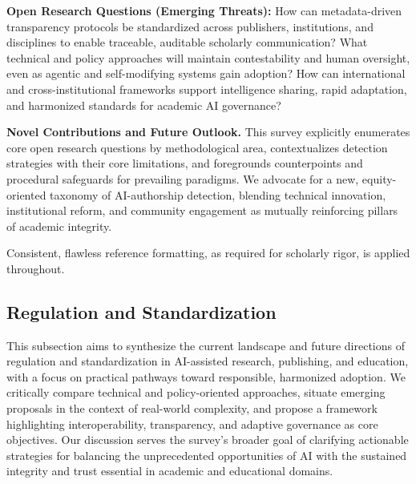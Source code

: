 \documentclass[sigconf]{acmart}
\begin{document}
\textbf{Open Research Questions (Emerging Threats):}
How can metadata-driven transparency protocols be standardized across publishers, institutions, and disciplines to enable traceable, auditable scholarly communication?
What technical and policy approaches will maintain contestability and human oversight, even as agentic and self-modifying systems gain adoption?
How can international and cross-institutional frameworks support intelligence sharing, rapid adaptation, and harmonized standards for academic AI governance?

\textbf{Novel Contributions and Future Outlook.}
This survey explicitly enumerates core open research questions by methodological area, contextualizes detection strategies with their core limitations, and foregrounds counterpoints and procedural safeguards for prevailing paradigms. We advocate for a new, equity-oriented taxonomy of AI-authorship detection, blending technical innovation, institutional reform, and community engagement as mutually reinforcing pillars of academic integrity.

Consistent, flawless reference formatting, as required for scholarly rigor, is applied throughout.

\subsection{Regulation and Standardization}

This subsection aims to synthesize the current landscape and future directions of regulation and standardization in AI-assisted research, publishing, and education, with a focus on practical pathways toward responsible, harmonized adoption. We critically compare technical and policy-oriented approaches, situate emerging proposals in the context of real-world complexity, and propose a framework highlighting interoperability, transparency, and adaptive governance as core objectives. Our discussion serves the survey's broader goal of clarifying actionable strategies for balancing the unprecedented opportunities of AI with the sustained integrity and trust essential in academic and educational domains.
\end{document}
